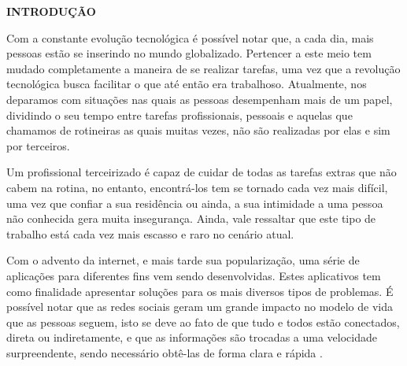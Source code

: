 \begin{flushleft}
	\vspace{1.2em}
	\textbf{\large INTRODUÇÃO}
	\vspace{2.9em}
\end{flushleft}
\thispagestyle{empty}


\par Com a constante evolução tecnológica é possível notar que, a cada dia, mais pessoas estão se inserindo no mundo globalizado. Pertencer a este meio tem mudado completamente a maneira de se realizar tarefas, uma vez que a revolução tecnológica busca facilitar o que até então era trabalhoso. Atualmente, nos deparamos com situações nas quais as pessoas desempenham mais de um papel, dividindo o seu tempo entre tarefas profissionais, pessoais e aquelas que chamamos de rotineiras as quais muitas vezes, não são realizadas por elas e sim por terceiros.

\par Um profissional terceirizado é capaz de cuidar de todas as tarefas extras que não cabem na rotina, no entanto, encontrá-los tem se tornado cada vez mais difícil, uma vez que confiar a sua residência ou ainda, a sua intimidade a uma pessoa não conhecida gera muita insegurança. Ainda, vale ressaltar que este tipo de trabalho está cada vez mais escasso e raro no cenário atual.

\par Com o advento da internet, e mais tarde sua popularização, uma série de aplicações para diferentes fins vem sendo desenvolvidas. Estes aplicativos tem como finalidade apresentar soluções para os mais diversos tipos de problemas. É possível notar que as redes sociais geram um grande impacto no modelo de vida que as pessoas seguem, isto se deve ao fato de que tudo e todos estão conectados, direta ou indiretamente, e que as informações são trocadas a uma velocidade surpreendente, sendo necessário obtê-las de forma clara e rápida \cite{barbosa_why_people_use_social_network}.

\par%

